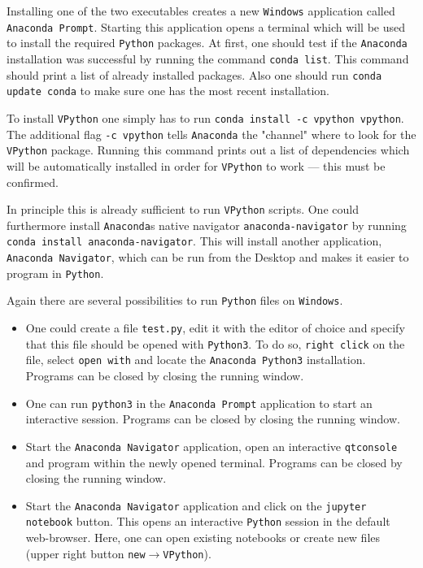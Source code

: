 \documentclass[12pt,ngerman,american]{iopart}
\newcommand{\python}[0]{\texttt{Python}}
\newcommand{\vpython}[0]{\texttt{VPython}}
\newcommand{\code}[1]{{\scriptsize\colorbox{light-gray}{\texttt{#1}}}}
\begin{document}
Installing one of the two executables creates a new \texttt{Windows} application called \texttt{Anaconda Prompt}.
Starting this application opens a terminal which will be used to install the required \python{} packages.
At first, one should test if the \texttt{Anaconda} installation was successful by running the command \code{conda list}.
This command should print a list of already installed packages.
Also one should run \code{conda update conda} to make sure one has the most recent installation.

To install \vpython{} one simply has to run \code{conda install -c vpython vpython}.
The additional flag \code{-c vpython} tells \texttt{Anaconda} the "channel" where to look for the \vpython{} package.
Running this command prints out a list of dependencies which will be automatically installed in order for \vpython{} to work --- this must be confirmed.

In principle this is already sufficient to run \vpython{} scripts.
One could furthermore install \texttt{Anaconda}s native navigator \texttt{anaconda-navigator} by running \code{conda install anaconda-navigator}.
This will install another application, \texttt{Anaconda Navigator}, which can be run from the Desktop and makes it easier to program in \python{}.

Again there are several possibilities to run \python{} files on \texttt{Windows}.
\begin{itemize}
	\item One could create a file \texttt{test.py}, edit it with the editor of choice and specify that this file should be opened with \texttt{Python3}.
		To do so, \texttt{right click} on  the file, select \texttt{open with} and locate the \texttt{Anaconda Python3} installation.
		Programs can be closed by closing the running window.
	\item One can run \code{python3} in the \texttt{Anaconda Prompt} application to start an interactive session.
		Programs can be closed by closing the running window.
	\item Start the \texttt{Anaconda Navigator} application, open an interactive \texttt{qtconsole} and program within the newly opened terminal.
		Programs can be closed by closing the running window.
	\item Start the \texttt{Anaconda Navigator} application and click on the \texttt{jupyter notebook} button.
		This opens an interactive \python{} session in the default web-browser.
		Here, one can open existing notebooks or create new files (upper right button \texttt{new}$\rightarrow$\vpython{}).
\end{itemize}
\end{document}
